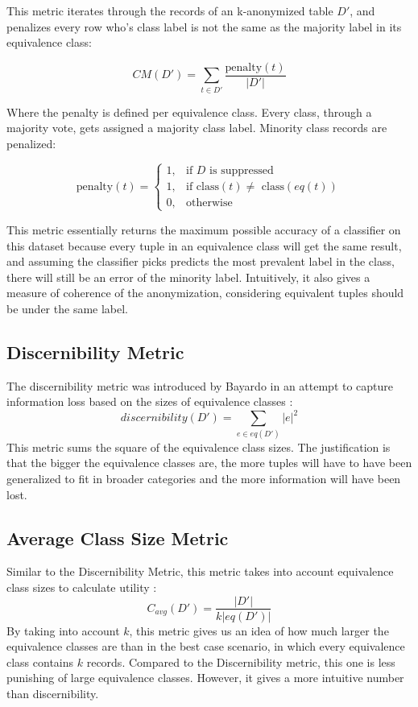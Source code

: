 This metric iterates through the records of an k-anonymized table $D'$, and penalizes every row who's class label is not the same as the majority label in its equivalence class:

$$
    CM(D') = \sum_{t \in D'} \frac{\mbox{penalty}(t)}{|D'|}
$$

Where the penalty is defined per equivalence class. Every class, through a majority vote, gets assigned a majority class label. Minority class records are penalized:

$$
    \mbox{penalty}(t) = 
    \begin{cases}
        1, & \text{if $D$ is suppressed}\\
        1, & \text{if class$(t) \not =$ class$(eq(t))$} \\
        0, & \text{otherwise}
    \end{cases}
$$

This metric essentially returns the maximum possible accuracy of a classifier on this dataset because every tuple in an equivalence class will get the same result, and assuming the classifier picks predicts the most prevalent label in the class, there will still be an error of the minority label. Intuitively, it also gives a measure of coherence of the anonymization, considering equivalent tuples should be under the same label.

\subsection{Discernibility Metric}
The discernibility metric was introduced by Bayardo in an attempt to capture information loss based on the sizes of equivalence classes \cite{discern_metric} : 
$$
discernibility(D') = \sum_{e \in eq(D')}|e|^2
$$
This metric sums the square of the equivalence class sizes. The justification is that the bigger the equivalence classes are, the more tuples will have to have been generalized to fit in broader categories and the more information will have been lost.

\subsection{Average Class Size Metric}
Similar to the Discernibility Metric, this metric takes into account equivalence class sizes to calculate utility \cite{mondrian}: 
$$
    C_{avg}(D') = \frac{|D'|}{k|eq(D')|}
$$
By taking into account $k$, this metric gives us an idea of how much larger the equivalence classes are than in the best case scenario, in which every equivalence class contains $k$ records. Compared to the Discernibility metric, this one is less punishing of large equivalence classes. However, it gives a more intuitive number than discernibility.

